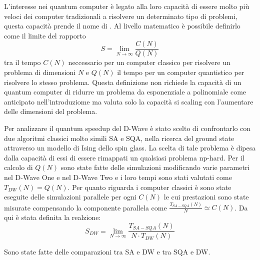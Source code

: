 L'interesse nei quantum computer è legato alla loro capacità di essere molto più veloci dei computer tradizionali a risolvere un determinato tipo di problemi, questa capacità prende il nome di . Al livello matematico è possibile definirlo come il limite del rapporto
$$S = \lim_{N \to \infty} \frac{C(N)}{Q(N)}$$
tra il tempo $C(N)$ neccessario per un computer classico per risolvere un problema di dimensioni $N$ e $Q(N)$ il tempo per un computer quantistico per risolvere lo stesso problema. Questa definizione non richiede la capacità di un quantum computer di ridurre un problema da esponenziale a polinomiale come anticipato nell'introduziome ma valuta solo la capacità si scaling con l'aumentare delle dimensioni del problema.

Per analizzare il quantum speedup del D-Wave è stato scelto di confrontarlo con due algoritmi classici molto simili SA e SQA, nella ricerca del ground state attraverso un modello di Ising dello spin glass.
La scelta di tale problema è dipesa dalla capacità di essi di essere rimappati un qualsiasi problema np-hard. Per il calcolo di $Q(N)$ sono state fatte delle simulazioni modificando varie parametri nel D-Wave One e nel D-Wave Two e i loro tempi sono stati valutati come $T_{DW}(N) = Q(N)$. Per quanto riguarda i computer classici è sono state eseguite delle simulazioni parallele per ogni $C(N)$ le cui prestazioni sono state misurate compensando la componente parallela come
 $\frac{T_{SA-SQA}(N)}{N} \simeq C(N)$. Da qui è stata definita la realzione:
$$S_{DW} = \lim_{N \to \infty} \frac{T_{SA-SQA}(N)}{N \cdot T_{DW}(N)}$$

Sono state fatte delle comparazioni tra SA e DW\cite{DDQS} e tra SQA e DW\cite{QVC}.





